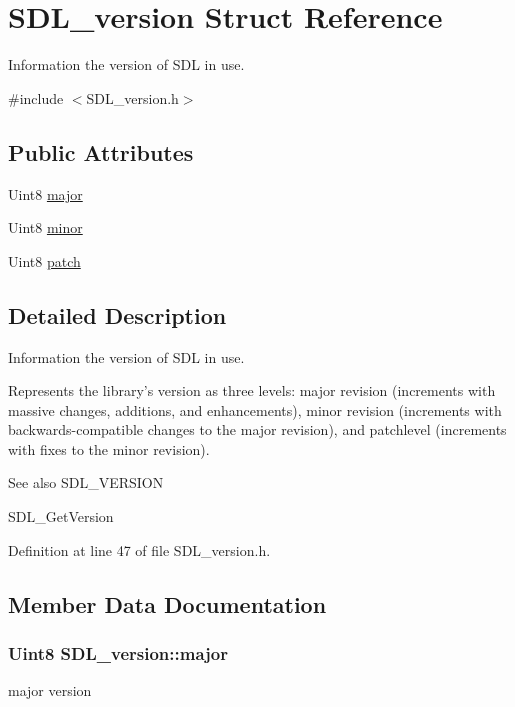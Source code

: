 \hypertarget{structSDL__version}{\section{S\+D\+L\+\_\+version Struct Reference}
\label{structSDL__version}
}


Information the version of S\+D\+L in use.  




{\ttfamily \#include $<$S\+D\+L\+\_\+version.\+h$>$}

\subsection*{Public Attributes}
\begin{DoxyCompactItemize}
\item 
Uint8 \hyperlink{structSDL__version_ad7d7674532073eed237b90f546c97cd0}{major}
\item 
Uint8 \hyperlink{structSDL__version_a6c35c7bf80245028d5970e6a504ecf57}{minor}
\item 
Uint8 \hyperlink{structSDL__version_aa6dacff18edee8cd037c773b843be0f1}{patch}
\end{DoxyCompactItemize}


\subsection{Detailed Description}
Information the version of S\+D\+L in use. 

Represents the library's version as three levels\+: major revision (increments with massive changes, additions, and enhancements), minor revision (increments with backwards-\/compatible changes to the major revision), and patchlevel (increments with fixes to the minor revision).

\begin{DoxySeeAlso}{See also}
S\+D\+L\+\_\+\+V\+E\+R\+S\+I\+O\+N 

S\+D\+L\+\_\+\+Get\+Version 
\end{DoxySeeAlso}


Definition at line 47 of file S\+D\+L\+\_\+version.\+h.



\subsection{Member Data Documentation}
\hypertarget{structSDL__version_ad7d7674532073eed237b90f546c97cd0}{
\subsubsection[{major}]{\setlength{\rightskip}{0pt plus 5cm}Uint8 S\+D\+L\+\_\+version\+::major}}\label{structSDL__version_ad7d7674532073eed237b90f546c97cd0}
major version 

